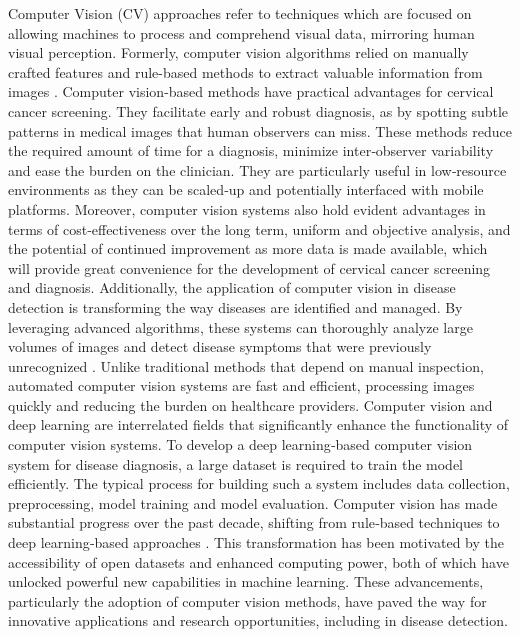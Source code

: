 \documentclass{svjour3}
\begin{document}
Computer Vision (CV) approaches refer to techniques which are focused on allowing machines to process and comprehend visual data, mirroring human visual perception. Formerly, computer vision algorithms relied on manually crafted features and rule-based methods to extract valuable information from images \cite{ref11}. Computer vision-based methods have practical advantages for cervical cancer screening. They facilitate early and robust diagnosis, as by spotting subtle patterns in medical images that human observers can miss. These methods reduce the required amount of time for a diagnosis, minimize inter‑observer variability and ease the burden on the clinician. They are particularly useful in low‑resource environments as they can be scaled‑up and potentially interfaced with mobile platforms. Moreover, computer vision systems also hold evident advantages in terms of cost‑effectiveness over the long term, uniform and objective analysis, and the potential of continued improvement as more data is made available, which will provide great convenience for the development of cervical cancer screening and diagnosis.
Additionally, the application of computer vision in disease detection is transforming the way diseases are identified and managed. By leveraging advanced algorithms, these systems can thoroughly analyze large volumes of images and detect disease symptoms that were previously unrecognized \cite{ref12}. Unlike traditional methods that depend on manual inspection, automated computer vision systems are fast and efficient, processing images quickly and reducing the burden on healthcare providers. Computer vision and deep learning are interrelated fields that significantly enhance the functionality of computer vision systems. To develop a deep learning‑based computer vision system for disease diagnosis, a large dataset is required to train the model efficiently. The typical process for building such a system includes data collection, preprocessing, model training and model evaluation. Computer vision has made substantial progress over the past decade, shifting from rule‑based techniques to deep learning‑based approaches \cite{ref13}. This transformation has been motivated by the accessibility of open datasets and enhanced computing power, both of which have unlocked powerful new capabilities in machine learning. These advancements, particularly the adoption of computer vision methods, have paved the way for innovative applications and research opportunities, including in disease detection.
\end{document}
